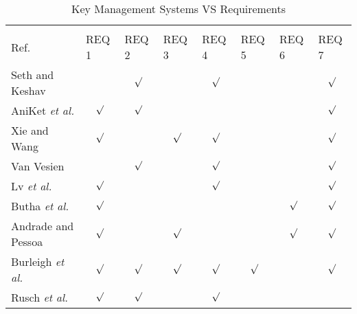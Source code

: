 \begin{table}[hbt]
\begin{tabular}{@{}lccccccc@{}}
 & \multicolumn{7}{l}{\cellcolor[HTML]{000000}{\color[HTML]{EFEFEF} key Management Requirement}} \\
 Ref. & \multicolumn{1}{l}{\cellcolor[HTML]{C0C0C0}REQ 1} & \multicolumn{1}{l}{\cellcolor[HTML]{C0C0C0}REQ 2} & \multicolumn{1}{l}{\cellcolor[HTML]{C0C0C0}REQ 3} & \multicolumn{1}{l}{\cellcolor[HTML]{C0C0C0}REQ 4} & \multicolumn{1}{l}{\cellcolor[HTML]{C0C0C0}REQ 5} & \multicolumn{1}{l}{\cellcolor[HTML]{C0C0C0}REQ 6} & \multicolumn{1}{l}{\cellcolor[HTML]{C0C0C0}REQ 7} \\
\cellcolor[HTML]{C0C0C0}Seth and Keshav \cite{seth2005practical}  &  & $\surd$ &  & $\surd$ &  &  & $\surd$ \\
\cellcolor[HTML]{C0C0C0}AniKet \textit{et al.} \cite{kate2007anonymity} & $\surd$ & $\surd$ &   &   &  &  & $\surd$ \\
\cellcolor[HTML]{C0C0C0}Xie and Wang \cite{xie2013practical} & $\surd$ & & $\surd$  & $\surd$  & &  & $\surd$ \\
\cellcolor[HTML]{C0C0C0}Van Vesien \cite{van2010dynamic}  & & $\surd$ & & $\surd$  & & & $\surd$ \\
\cellcolor[HTML]{C0C0C0}Lv \textit{et al.} \cite{lv2014non} & $\surd$ &  &  & $\surd$  &  &  & $\surd$ \\
\cellcolor[HTML]{C0C0C0}Butha \textit{et al.} \cite{bhutta2014efficient} & $\surd$ & & &  & & $\surd$ & $\surd$ \\
\cellcolor[HTML]{C0C0C0}Andrade and Pessoa \cite{de2016fully} & $\surd$ &  & $\surd$  &  & & $\surd$ & $\surd$ \\
\cellcolor[HTML]{C0C0C0}Burleigh \textit{et al.} \cite{burleigh-dtnwg-dtka-01}   & $\surd$   & $\surd$   & $\surd$ & $\surd$ & $\surd$  &  & $\surd$  \\
\cellcolor[HTML]{C0C0C0}R{u}sch \textit{et al.}\cite{rusch2017forward}   & $\surd$  & $\surd$ &  & $\surd$ &  &  &   \\
\end{tabular}
\caption{Key Management Systems VS Requirements}
\label{table:summaryREQ}
\end{table}




